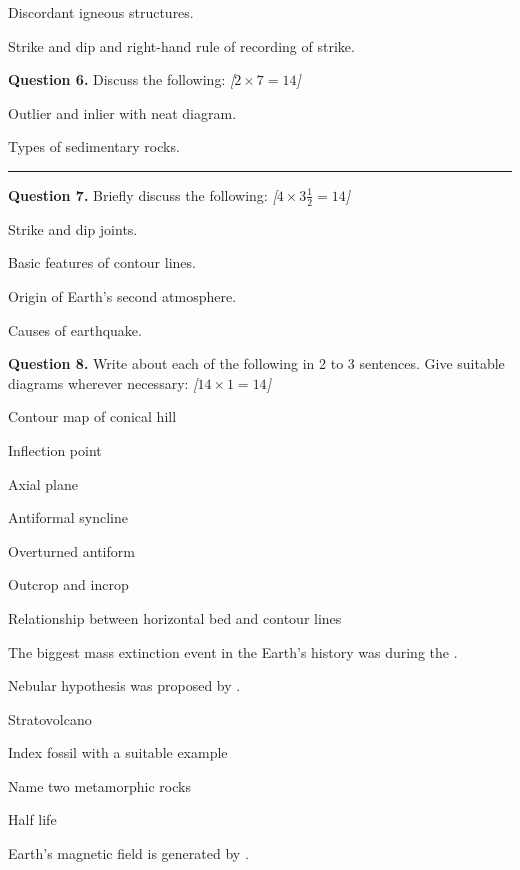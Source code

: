 \documentclass[11pt,a4paper]{article}
\newcommand{\pts}[1]{\hfill   \textit{[#1]}}
\begin{document}
\begin{parts}
  \item Discordant igneous structures.
  \item Strike and dip and right-hand rule of recording of strike.
\end{parts}

\medskip


\noindent   \textbf{Question 6.} Discuss the following: \pts{$2  \times 7 = 14$}

\begin{parts}
  \item Outlier and inlier with neat diagram.
  \item Types of sedimentary rocks.
\end{parts}

\bigskip


\rule{\linewidth}{0.4pt}\smallskip




\noindent   \textbf{Question 7.} Briefly discuss the following: \pts{$4  \times 3\frac{1}{2} = 14$}

\begin{parts}
  \item Strike and dip joints.
  \item Basic features of contour lines.
  \item Origin of Earth's second atmosphere.
  \item Causes of earthquake.
\end{parts}

\medskip


\noindent   \textbf{Question 8.} Write about each of the following in 2 to 3 sentences. Give suitable diagrams wherever necessary: \pts{$14  \times 1 = 14$}

\begin{parts}
  \item Contour map of conical hill
  \item Inflection point
  \item Axial plane
  \item Antiformal syncline
  \item Overturned antiform
  \item Outcrop and incrop
  \item Relationship between horizontal bed and contour lines
  \item The biggest mass extinction event in the Earth's history was during the \underline{\hspace{2cm}}.
  \item Nebular hypothesis was proposed by \underline{\hspace{2cm}}.
  \item Stratovolcano
  \item Index fossil with a suitable example
  \item Name two metamorphic rocks
  \item Half life
  \item Earth's magnetic field is generated by \underline{\hspace{2cm}}.
\end{parts}
\end{document}
